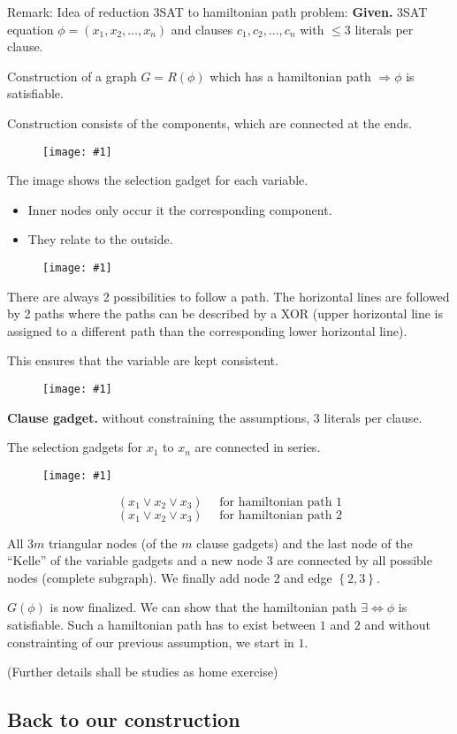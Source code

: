 \documentclass[a4paper]{article}
\newcommand{\drawing}[1]{%
 \begin{figure}[ht]
  \begin{center}
   \texttt{[image: \#1]}
  \end{center}
 \end{figure}
}
\newcommand{\given}[1]{\textbf{Given.} #1\par}
\newcommand{\probl}[1]{\text{\textsc{#1}}}
\newcommand{\set}[1]{\left\{#1\right\}}
\begin{document}
Remark:
Idea of reduction 3SAT to hamiltonian path problem:
\given{3SAT equation $\phi = (x_1, x_2, \ldots, x_n)$ and clauses $c_1, c_2, \ldots, c_n$ with $\leq 3$ literals per clause.}

Construction of a graph $G = R(\phi)$ which has a hamiltonian path $\Rightarrow \phi$ is satisfiable.

Construction consists of the components, which are connected at the ends.

\drawing{3sat_hamiltonian_path.pdf}

The image shows the selection gadget for each variable.
\begin{itemize}
  \item Inner nodes only occur it the corresponding component.
  \item They relate to the outside.
\end{itemize}

\drawing{consistency_graph.pdf}

There are always 2 possibilities to follow a path.
The horizontal lines are followed by 2 paths where the paths can be described by a XOR
(upper horizontal line is assigned to a different path than the corresponding
lower horizontal line).

This ensures that the variable are kept consistent.

\drawing{clause_gadgets.pdf}

\textbf{Clause gadget.} without constraining the assumptions, 3 literals per clause.

The selection gadgets for $x_1$ to $x_n$ are connected in series.

\drawing{gadgets.pdf}

\[
    (x_1 \lor x_2 \lor x_3)  \quad \text{ for hamiltonian path 1}
\] \[
    (x_1 \lor x_2 \lor x_3)  \quad \text{ for hamiltonian path 2}
\]

All $3m$ triangular nodes (of the $m$ clause gadgets) and the last node
of the ``Kelle'' of the variable gadgets and a new node 3 are connected
by all possible nodes (complete subgraph).
We finally add node $2$ and edge $\set{2,3}$.

$G(\phi)$ is now finalized.
We can show that the hamiltonian path $\exists \Leftrightarrow \phi$ is satisfiable.
Such a hamiltonian path has to exist between $1$ and $2$ and without constrainting
of our previous assumption, we start in $1$.

(Further details shall be studies as home exercise)

\subsection{Back to our \probl{EXACT-TSP} construction}
\end{document}
